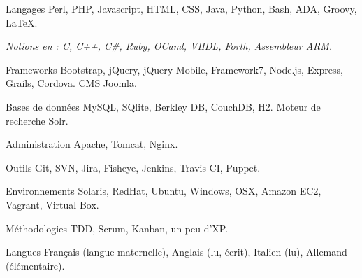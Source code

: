 
\begin{cvskills}

  \cvskill
    {Langages}
    {Perl, PHP, Javascript, HTML, CSS, Java, Python, Bash, ADA, Groovy, LaTeX.
    }

  \cvskill
    {}
    {\textit{Notions en : C, C++, C\#, Ruby, OCaml, VHDL, Forth, Assembleur ARM.}}

  \cvskill
    {Frameworks}
    {Bootstrap, jQuery, jQuery Mobile, Framework7, Node.js, Express, Grails, Cordova. CMS Joomla.}

  \cvskill
    {Bases de données}
    {MySQL, SQlite, Berkley DB, CouchDB, H2. Moteur de recherche Solr.}

  \cvskill
    {Administration}
    {Apache, Tomcat, Nginx.}

  \cvskill
    {Outils}
    {Git, SVN, Jira, Fisheye, Jenkins, Travis CI, Puppet.}

  \cvskill
    {Environnements}
    {Solaris, RedHat, Ubuntu, Windows, OSX, Amazon EC2, Vagrant, Virtual Box.}

  \cvskill
    {Méthodologies}
    {TDD, Scrum, Kanban, un peu d'XP.}

  \cvskill
    {Langues}
    {Français (langue maternelle), Anglais (lu, écrit), Italien (lu), Allemand (élémentaire).}

\end{cvskills}
